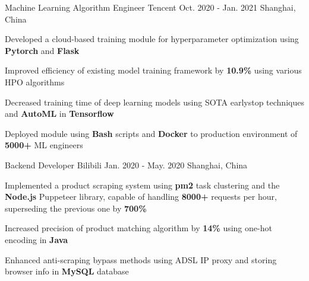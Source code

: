 

\begin{cventries}

  \cventry
    {Machine Learning Algorithm Engineer} %
    {Tencent} %
    {Oct. 2020 - Jan. 2021} %
    {Shanghai, China} %
    {
      \begin{cvitems} %
        \item Developed a cloud-based training module for hyperparameter optimization using \textbf{Pytorch} and \textbf{Flask}
        \item Improved efficiency of existing model training framework by \textbf{10.9\%} using various HPO algorithms
        \item Decreased training time of deep learning models using SOTA earlystop techniques and \textbf{AutoML} in \textbf{Tensorflow}
        \item Deployed module using \textbf{Bash} scripts and \textbf{Docker} to production environment of \textbf{5000+} ML engineers
      \end{cvitems}
    }

  \cventry
    {Backend Developer} %
    {Bilibili} %
    {Jan. 2020 - May. 2020} %
    {Shanghai, China} %
    {
      \begin{cvitems} %
        \item Implemented a product scraping system using \textbf{pm2} task clustering and the \textbf{Node.js} Puppeteer library, capable of handling \textbf{8000+} requests per hour, superseding the previous one by \textbf{700\%}
        \item Increased precision of product matching algorithm by \textbf{14\%} using one-hot encoding in \textbf{Java}
        \item Enhanced anti-scraping bypass methods using ADSL IP proxy and storing browser info in \textbf{MySQL} database
      \end{cvitems}
    }


\end{cventries}
